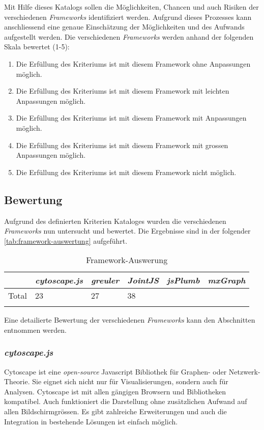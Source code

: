 Mit Hilfe dieses Katalogs sollen die Möglichkeiten, Chancen und auch Risiken der verschiedenen \textit{Frameworks} identifiziert werden. Aufgrund dieses Prozesses kann anschliessend eine genaue Einschätzung der Möglichkeiten und des Aufwands aufgestellt werden. Die verschiedenen  \textit{Frameworks} werden anhand der folgenden Skala bewertet (1-5): 
\begin{enumerate}
  \item Die Erfüllung des Kriteriums ist mit diesem Framework ohne Anpassungen möglich.
  \item Die Erfüllung des Kriteriums ist mit diesem Framework mit leichten Anpassungen möglich.
  \item Die Erfüllung des Kriteriums ist mit diesem Framework mit Anpassungen möglich.
  \item Die Erfüllung des Kriteriums ist mit diesem Framework mit grossen Anpassungen möglich.
  \item Die Erfüllung des Kriteriums ist mit diesem Framework nicht möglich.
\end{enumerate}

\subsection{Bewertung}
Aufgrund des definierten Kriterien Kataloges wurden die verschiedenen \textit{Frameworks} nun untersucht und bewertet. Die Ergebnisse sind in der folgender \autoref{tab:framework-auswertung} aufgeführt.

\begin{longtable}{|p{0.8cm}| p{2.2cm} | p{1.5cm}| p{1.5cm}| p{2cm}| p{2cm}|}
  \hline
    & \textit{cytoscape.js} & \textit{greuler} &\textit{JointJS} &\textit{jsPlumb} &\textit{mxGraph}  \\\hline
    Total & 23 & 27 & 38 & &\\\hline
    \caption{Framework-Auswerung}
  \label{tab:framework-auswertung}
\end{longtable}
Eine detailierte Bewertung der verschiedenen \textit{Frameworks} kann den Abschnitten entnommen werden.

\subsubsection{\textit{cytoscape.js}}
\label{cytoscape}
Cytoscape ist eine \textit{open-source} Javascript Bibliothek für Graphen- oder Netzwerk-Theorie. Sie eignet sich nicht nur für Visualisierungen, sondern auch für Analysen. Cytoscape ist mit allen gängigen Browsern und Bibliotheken kompatibel. Auch funktioniert die Darstellung ohne zusätzlichen Aufwand auf allen Bildschirmgrössen. Es gibt zahlreiche Erweiterungen und auch die Integration in bestehende Lösungen ist einfach möglich. \cite{1_franz_lopes_huck_dong_sumer_bader_2016}

